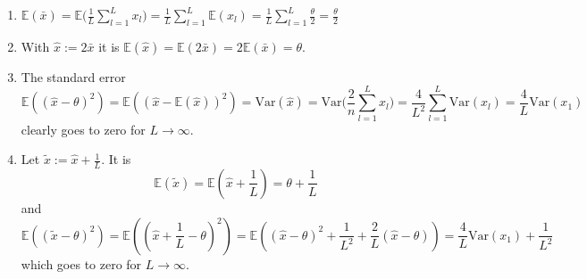 \documentclass[11pt]{article} %
\newcommand{\E}{\mathbb{E}}
\newcommand{\Var}{\mathrm{Var}}
\begin{document}
\begin{enumerate}[label= (\alph*) \;]
  \item $ \displaystyle
    \E(\bar x) = \E\Big( \frac 1 L \sum_{l=1}^L x_l \Big)
    = \frac 1 L \sum_{l=1}^L \E(x_l)
    = \frac 1 L \sum_{l=1}^L \frac \theta 2
    = \frac \theta 2$

  \item With $\hat x := 2 \bar x$ it is
    $\E(\hat x) = \E(2 \bar x) = 2 \E(\bar x) = \theta$.

  \item The standard error
    \[ \displaystyle
      \E((\hat x - \theta)^2)
      = \E((\hat x - \E(\hat x))^2)
      = \Var(\hat x)
      = \Var\Big( \frac 2 n \sum_{l=1}^L x_l \Big)
      = \frac{4}{L^2} \sum_{l=1}^L \Var(x_l)
      = \frac 4 L \Var(x_1)
    \]
    clearly goes to zero for $L \to \infty$.

  \item Let $\tilde x := \hat x + \frac 1 L$. It is
    \[
      \E(\tilde x)
      = \E(\hat x + \frac 1 L)
      = \theta + \frac 1 L
    \]
    and
    \[
      \E((\tilde x - \theta)^2)
      = \E((\hat x + \frac 1 L - \theta)^2)
      = \E((\hat x - \theta)^2 + \frac{1}{L^2} + \frac 2 L (\hat x - \theta))
      = \frac 4 L \Var(x_1) + \frac{1}{L^2}
    \]
    which goes to zero for $L \to \infty$.
\end{enumerate}
\end{document}
